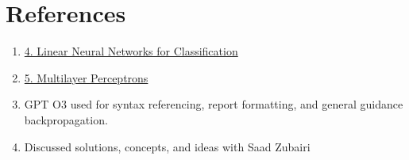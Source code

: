 \documentclass{article}
\begin{document}


\section*{References}

\begin{enumerate}
    \item \href{https://d2l.ai/chapter_linear-classification/index.html}{4. Linear Neural Networks for Classification}
    \item \href{https://d2l.ai/chapter_multilayer-perceptrons/index.html}{5. Multilayer Perceptrons}
    \item GPT O3 used for syntax referencing, report formatting, and general guidance backpropagation.
    \item Discussed solutions, concepts, and ideas with Saad Zubairi
\end{enumerate}
\end{document}
